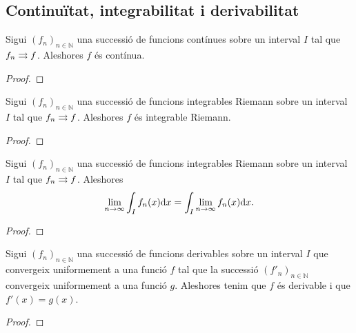 \documentclass[../Apunts.tex]{subfiles}
\begin{document}
	\subsection{Continuïtat, integrabilitat i derivabilitat}
	\begin{theorem}
		\label{thm:si una successió de funcions contínues convergeix uniformement, ho fa a una funció contínua}
		Sigui \((f_{n})_{n\in\mathbb{N}}\) una successió de funcions contínues sobre un interval \(I\) tal que \(f_{n}\rightrightarrows f\). Aleshores \(f\) és contínua.
		\begin{proof}
		\end{proof}
	\end{theorem}
	\begin{theorem}
		\label{thm:si una successió de funcions integrables Riemann convergix unifoemement, ho fa a una funció integrable Riemann}
		Sigui \((f_{n})_{n\in\mathbb{N}}\) una successió de funcions integrables Riemann sobre un interval \(I\) tal que \(f_{n}\rightrightarrows f\). Aleshores \(f\) és integrable Riemann.
		\begin{proof}
		\end{proof}
	\end{theorem}
	\begin{theorem}
		\label{thm:si una successió de funcions convergeix uniformement aleshores el límit de la integral dels elements de la succesió és la integral del límit dels elements de la successió}
		Sigui \((f_{n})_{n\in\mathbb{N}}\) una successió de funcions integrables Riemann sobre un interval \(I\) tal que \(f_{n}\rightrightarrows f\). Aleshores
		\[\lim_{n\to\infty}\int_{I}f_{n}(x)\mathrm{d} x=\int_{I}\lim_{n\to\infty}f_{n}(x)\mathrm{d} x.\]
		\begin{proof}
		\end{proof}
	\end{theorem}
	\begin{theorem}
		\label{thm:condició per la derivabilitat d'una successió de funcions}
		Sigui \((f_{n})_{n\in\mathbb{N}}\) una successió de funcions derivables sobre un interval \(I\) que convergeix uniformement a una funció \(f\) tal que la successió \((f'_{n})_{n\in\mathbb{N}}\) convergeix uniformement a una funció \(g\). Aleshores tenim que \(f\) és derivable i que \(f'(x)=g(x)\).
		\begin{proof} %
		\end{proof}
	\end{theorem}
\end{document}
